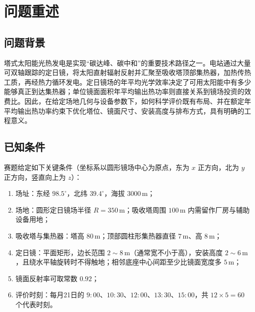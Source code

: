 \documentclass[withoutpreface,bwprint]{cumcmthesis}
\begin{document}
\newpage
\listoffigures
\listoftables
\newpage

\section{问题重述}

\subsection{问题背景}
塔式太阳能光热发电是实现“碳达峰、碳中和”的重要技术路径之一。电站通过大量可双轴跟踪的定日镜，将太阳直射辐射反射并汇聚至吸收塔顶部集热器，加热传热工质，再经热力循环发电。定日镜场的年平均光学效率决定了可用太阳能中有多少能够真正到达集热器；单位镜面面积年平均输出热功率则直接关系到镜场投资的效费比。因此，在给定场地几何与设备参数下，如何科学评价既有布局、并在额定年平均输出热功率约束下优化塔位、镜面尺寸、安装高度与排布方式，具有明确的工程意义。

\subsection{已知条件}
赛题给定如下关键条件（坐标系以圆形镜场中心为原点，东为 $x$ 正方向，北为 $y$ 正方向，竖直向上为 $z$）：
\begin{enumerate}[leftmargin=2em]
  \item 场址：东经 $98.5^\circ$，北纬 $39.4^\circ$，海拔 $3000\,\mathrm{m}$；
  \item 场地：圆形定日镜场半径 $R=350\,\mathrm{m}$；吸收塔周围 $100\,\mathrm{m}$ 内需留作厂房与辅助设备用地；
  \item 吸收塔与集热器：塔高 $80\,\mathrm{m}$；顶部圆柱形集热器直径 $7\,\mathrm{m}$、高 $8\,\mathrm{m}$；
  \item 定日镜：平面矩形，边长范围 $2\sim8\,\mathrm{m}$（通常宽不小于高），安装高度 $2\sim6\,\mathrm{m}$，且绕水平轴旋转时不得触地；相邻底座中心间距至少比镜面宽度多 $5\,\mathrm{m}$；
  \item 镜面反射率可取常数 $0.92$；
  \item 评价时刻：每月21日的 $9:00$、$10:30$、$12:00$、$13:30$、$15:00$，共 $12\times5=60$ 个代表时刻。
\end{enumerate}
\end{document}
